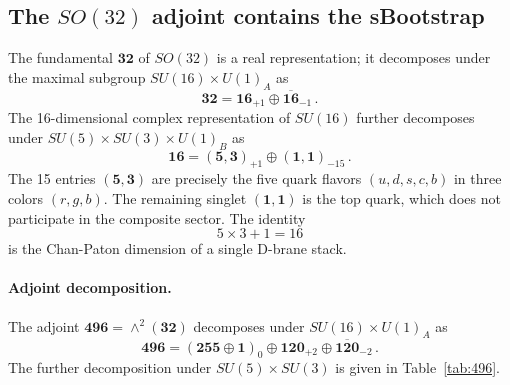 \documentclass[12pt,a4paper]{article}
\begin{document}
\subsection{The $SO(32)$ adjoint contains the sBootstrap}

The fundamental $\mathbf{32}$ of $SO(32)$ is a real representation;
it decomposes under the maximal subgroup $SU(16) \times U(1)_A$ as
\begin{equation}
  \mathbf{32} = \mathbf{16}_{+1} \oplus \overline{\mathbf{16}}_{-1}\,.
\end{equation}
The 16-dimensional complex representation of $SU(16)$ further
decomposes under $SU(5) \times SU(3) \times U(1)_B$ as
\begin{equation}\label{eq:16-decomp}
  \mathbf{16} = (\mathbf{5},\mathbf{3})_{+1}
    \oplus (\mathbf{1},\mathbf{1})_{-15}\,.
\end{equation}
The 15 entries $(\mathbf{5},\mathbf{3})$ are precisely the five quark
flavors $(u,d,s,c,b)$ in three colors $(r,g,b)$.  The remaining
singlet $(\mathbf{1},\mathbf{1})$ is the top quark, which does not
participate in the composite sector.  The identity
\begin{equation}
  5 \times 3 + 1 = 16
\end{equation}
is the Chan-Paton dimension of a single D-brane stack.

\paragraph{Adjoint decomposition.}
The adjoint $\mathbf{496} = \wedge^2(\mathbf{32})$ decomposes under
$SU(16) \times U(1)_A$ as
\begin{equation}
  \mathbf{496} = (\mathbf{255} \oplus \mathbf{1})_0
    \oplus \mathbf{120}_{+2} \oplus \overline{\mathbf{120}}_{-2}\,.
\end{equation}
The further decomposition under $SU(5) \times SU(3)$ is given in
Table~\ref{tab:496}.
\end{document}
